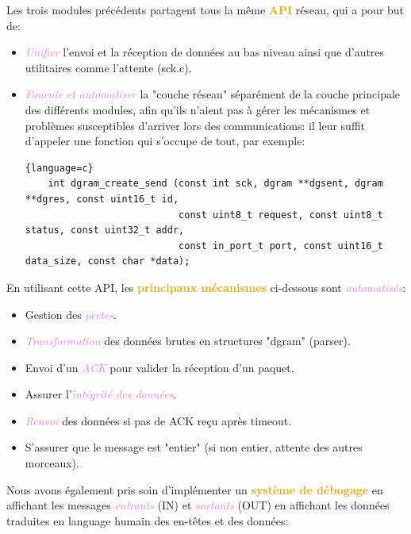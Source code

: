 \documentclass[a4paper]{article}
\let\oldtextbf\textbf
\renewcommand{\textbf}[1]{\textcolor{orange}{\oldtextbf{#1}}}
\let\oldtextit\textit
\renewcommand{\textit}[1]{\textcolor{violet}{\oldtextit{#1}}}
\begin{document}
Les trois modules précédents partagent tous la même \textbf{API} réseau, qui a pour but de:
\begin{itemize}
    \item \textit{Unifier} l'envoi et la réception de données au bas niveau ainsi que d'autres utilitaires comme l'attente (sck.c).
    \item \textit{Fournir et automatiser} la "couche réseau" séparément de la couche principale des différents modules, afin qu'ils n'aient pas à gérer les mécanismes et problèmes susceptibles d'arriver lors des communications: il leur suffit d'appeler une fonction qui s'occupe de tout, par exemple:
    \begin{lstlisting}{language=c}
    int dgram_create_send (const int sck, dgram **dgsent, dgram **dgres, const uint16_t id,
                           const uint8_t request, const uint8_t status, const uint32_t addr,
                           const in_port_t port, const uint16_t data_size, const char *data);
    \end{lstlisting}
\end{itemize}

En utilisant cette API, les \textbf{principaux mécanismes} ci-dessous sont \textit{automatisés}:
\begin{itemize}
    \item Gestion des \textit{pertes}.
    \item \textit{Transformation} des données brutes en structures "dgram" (parser).
    \item Envoi d'un \textit{ACK} pour valider la réception d'un paquet.
    \item Assurer l'\textit{intégrité des données}.
    \item \textit{Renvoi} des données si pas de ACK reçu après timeout.
    \item S'assurer que le message est "entier" (si non entier, attente des autres morceaux).
\end{itemize}

\newpage
Nous avons également pris soin d'implémenter un \textbf{système de débogage} en affichant les messages \textit{entrants} (IN) et \textit{sortants} (OUT) en affichant les données traduites en language humain des en-têtes et des données:
\end{document}
